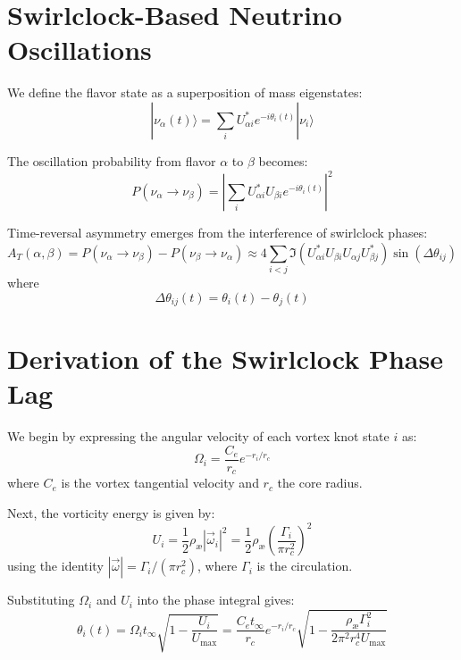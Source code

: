 \section{Swirlclock-Based Neutrino Oscillations}

We define the flavor state as a superposition of mass eigenstates:
\begin{equation}
|\nu_\alpha(t)\rangle = \sum_i U_{\alpha i}^* e^{-i\theta_i(t)} |\nu_i\rangle
\end{equation}

The oscillation probability from flavor \( \alpha \) to \( \beta \) becomes:
\begin{equation}
P(\nu_\alpha \rightarrow \nu_\beta) = \left| \sum_i U_{\alpha i}^* U_{\beta i} e^{-i\theta_i(t)} \right|^2
\end{equation}

Time-reversal asymmetry emerges from the interference of swirlclock phases:
\begin{equation}
A_T(\alpha, \beta) = P(\nu_\alpha \rightarrow \nu_\beta) - P(\nu_\beta \rightarrow \nu_\alpha) \approx 4 \sum_{i<j} \Im(U_{\alpha i}^* U_{\beta i} U_{\alpha j} U_{\beta j}^*) \sin(\Delta \theta_{ij})
\end{equation}
where
\begin{equation}
\Delta \theta_{ij}(t) = \theta_i(t) - \theta_j(t)
\end{equation}

\section{Derivation of the Swirlclock Phase Lag}

We begin by expressing the angular velocity of each vortex knot state \( i \) as:
\begin{equation}
\Omega_i = \frac{C_e}{r_c} e^{-r_i / r_c}
\end{equation}
where \( C_e \) is the vortex tangential velocity and \( r_c \) the core radius.

Next, the vorticity energy is given by:
\begin{equation}
U_i = \frac{1}{2} \rho_\text{\ae} |\vec{\omega}_i|^2 = \frac{1}{2} \rho_\text{\ae} \left( \frac{\Gamma_i}{\pi r_c^2} \right)^2
\end{equation}
using the identity \( |\vec{\omega}| = \Gamma_i / (\pi r_c^2) \), where \( \Gamma_i \) is the circulation.

Substituting \( \Omega_i \) and \( U_i \) into the phase integral gives:
\begin{equation}
\theta_i(t) = \Omega_i t_\infty \sqrt{1 - \frac{U_i}{U_\text{max}}} = \frac{C_e t_\infty}{r_c} e^{-r_i / r_c} \sqrt{1 - \frac{\rho_\text{\ae} \Gamma_i^2}{2 \pi^2 r_c^4 U_\text{max}}}
\end{equation}

